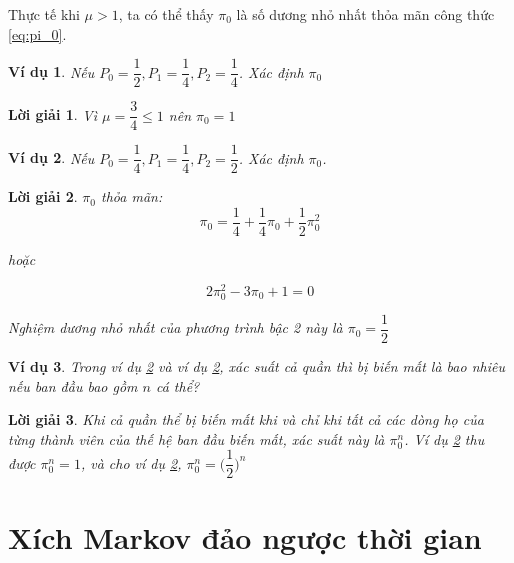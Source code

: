 \documentclass[14pt, a4paper]{article}
\numberwithin{equation}{section}
\numberwithin{figure}{section}
\theoremstyle{sltheorem}
\newtheorem{vd}{Ví dụ}
\theoremstyle{soltheorem}
\newtheorem*{loigiai}{Lời giải}
\numberwithin{dl}{section}
\numberwithin{vd}{section}
\begin{document}
    Thực tế khi $\mu > 1$, ta có thể thấy $\pi_0$ là số dương nhỏ nhất thỏa mãn công thức \ref{eq:pi_0}.

    \begin{vd}
        Nếu $P_0 = \dfrac{1}{2}, P_1 = \dfrac{1}{4}, P_2 = \dfrac{1}{4}$. Xác định $\pi_0$
    \end{vd}

    \begin{loigiai}
        Vì $\mu = \dfrac{3}{4} \leq 1$ nên $\pi_0 = 1$
    \end{loigiai}

    \begin{vd} \label{vd:4.32}
        Nếu $P_0 = \dfrac{1}{4}, P_1 = \dfrac{1}{4}, P_2 = \dfrac{1}{2}$. Xác định $\pi_0$.
    \end{vd}

    \begin{loigiai} \label{vd:4.33}
        $\pi_0$ thỏa mãn:
        \begin{equation*}
            \pi_0 = \dfrac{1}{4} + \dfrac{1}{4} \pi_0 + \dfrac{1}{2} \pi_0^2
        \end{equation*}

        hoặc

        \begin{equation*}
            2 \pi_0^2 - 3 \pi_0 + 1 = 0
        \end{equation*}

        Nghiệm dương nhỏ nhất của phương trình bậc 2 này là $\pi_0 = \dfrac{1}{2}$
    \end{loigiai}

    \begin{vd}
        Trong ví dụ \ref{vd:4.32} và ví dụ \ref{vd:4.33}, xác suất cả quần thì bị biến mất là bao nhiêu nếu ban đầu bao gồm $n$ cá thể?
    \end{vd}

    \begin{loigiai}
        Khi cả quần thể bị biến mất khi và chỉ khi tất cả các dòng họ của từng thành viên của thế hệ ban đầu biến mất, xác suất này là $\pi_0^n$.
        Ví dụ \ref{vd:4.32} thu được $\pi_0^n = 1$, và cho ví dụ \ref{vd:4.33}, $\pi_0^n = \Big ( \dfrac{1}{2} \Big )^n$
    \end{loigiai}

    \section{Xích Markov đảo ngược thời gian}
\end{document}
